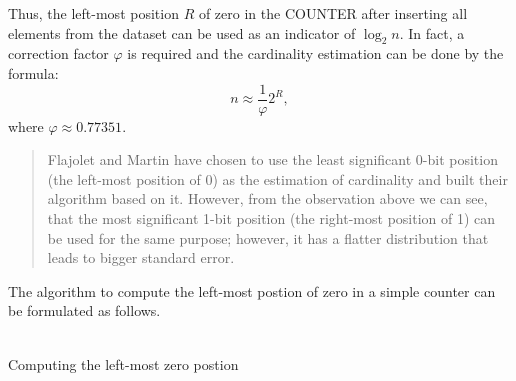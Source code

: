 \documentclass[a4paper,13pt]{article}
\theoremstyle{mytheor}
\begin{document}
Thus, the left-most position $R$ of zero in the COUNTER after inserting
all elements from the dataset can be used as an indicator of $\log_2n$. In
fact, a correction factor $\varphi$ is required and the cardinality estimation can
be done by the formula:
\[
    n \approx \frac{1}{\varphi}2^R,
\]
\vspace{0.4cm}
where $\varphi\approx0.77351.$\\
\vspace{0.4cm}
\begin{quote}
    Flajolet and Martin have chosen to use the least significant 0-bit position
    (the left-most position of 0) as the estimation of cardinality and built their
    algorithm based on it. However, from the observation above we can see,
    that the most significant 1-bit position (the right-most position of 1) can
    be used for the same purpose; however, it has a flatter distribution that leads to
    bigger standard error.\\
\end{quote}
\indent The algorithm to compute the left-most postion of zero in a simple
counter can be formulated as follows.\\\\
\begin{algorithm}[H]
    \DontPrintSemicolon
    \LinesNumberedHidden
    \caption[]{Computing the left-most zero postion}
    \newline
\end{algorithm}
\vspace{0.4cm}
\end{document}
